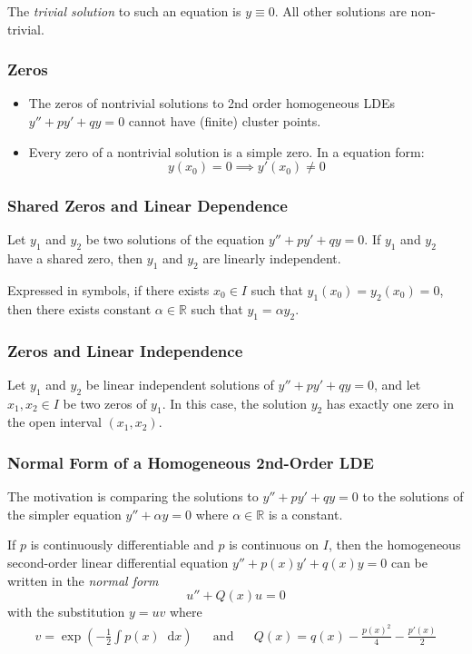 \documentclass[11pt, a4paper]{article}
\newcommand{\diff}{\mathop{}\!\mathrm{d}} %
\newcommand{\R}{\mathbb{R}} %
\begin{document}
The \textit{trivial solution} to such an equation is $ y \equiv 0 $. All other solutions are non-trivial.

\subsubsection{Zeros}
\begin{itemize}
	\item The zeros of nontrivial solutions to 2nd order homogeneous LDEs $ y'' + py' + qy = 0 $ cannot have (finite) cluster points. 
	
	\item Every zero of a nontrivial solution is a simple zero. In a equation form:
	\begin{equation*}
		y(x_0) = 0 \implies y'(x_0) \neq 0
	\end{equation*}
\end{itemize}

\subsubsection{Shared Zeros and Linear Dependence}
Let $ y_1 $ and $ y_2 $ be two solutions of the equation $ y'' + py' + qy = 0 $. If $ y_1 $ and $ y_2 $ have a shared zero, then $ y_1 $ and $ y_2 $ are linearly independent. 

Expressed in symbols, if there exists $ x_0 \in I $ such that $ y_1(x_0) = y_2(x_0) = 0$, then there exists constant $ \alpha \in \R $ such that $ y_1 = \alpha y_2 $.

\subsubsection{Zeros and Linear Independence}
Let $ y_1 $ and $ y_2 $ be linear independent solutions of $ y'' + py' + qy = 0 $, and let $ x_1, x_2 \in I $ be two zeros of $ y_1 $. In this case, the solution $ y_2 $ has exactly one zero in the open interval $ (x_1, x_2) $.


\subsubsection{Normal Form of a Homogeneous 2nd-Order LDE}
The motivation is comparing the solutions to $ y'' + py' + qy = 0 $ to the solutions of the simpler equation $ y'' + \alpha y = 0 $ where $ \alpha \in \R $ is a constant.

If $ p $ is continuously differentiable and $ p $ is continuous on $ I $, then the homogeneous second-order linear differential equation $ y'' + p(x)y' + q(x)y = 0 $  can be written in the \textit{normal form}
\begin{equation*}
	u'' + Q(x)u = 0
\end{equation*}
with the substitution $ y = uv $ where
\begin{align*}
	v = \exp(-\frac{1}{2} \int p(x) \diff x) && \text{and}
	&& Q(x) = q(x) - \frac{p(x)^2}{4} - \frac{p'(x)}{2}
\end{align*}
\end{document}
